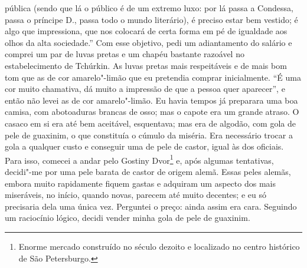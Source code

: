 pública (sendo que lá o público é de um extremo luxo: por lá passa a
Condessa, passa o príncipe D., passa todo o mundo literário), é preciso
estar bem vestido; é algo que impressiona, que nos colocará de certa
forma em pé de igualdade aos olhos da alta sociedade.” Com esse
objetivo, pedi um adiantamento do salário e comprei um par de luvas
pretas e um chapéu bastante razoável no estabelecimento de Tchúrkin. As
luvas pretas mais respeitáveis e de mais bom tom que as de cor
amarelo"-limão que eu pretendia comprar inicialmente. “É uma cor muito
chamativa, dá muito a impressão de que a pessoa quer aparecer”, e então
não levei as de cor amarelo"-limão. Eu havia tempos já preparara uma boa
camisa, com abotoaduras brancas de osso; mas o capote era um grande
atraso. O casaco em si era até bem aceitável, esquentava; mas era de
algodão, com gola de pele de guaxinim, o que constituía o cúmulo da
miséria. Era necessário trocar a gola a qualquer custo e conseguir uma
de pele de castor, igual às dos oficiais. Para isso, comecei a andar
pelo Gostiny Dvor\footnote{ Enorme mercado construído no século dezoito e
localizado no centro histórico de São Petersburgo.} 
e, após algumas tentativas, decidi"-me por uma
pele barata de castor de origem alemã. Essas peles alemãs, embora muito
rapidamente fiquem gastas e adquiram um aspecto dos mais miseráveis, no
início, quando novas, parecem até muito decentes; e eu só precisaria
dela uma única vez. Perguntei o preço: ainda assim era cara. Seguindo
um raciocínio lógico, decidi vender minha gola de pele de guaxinim.

